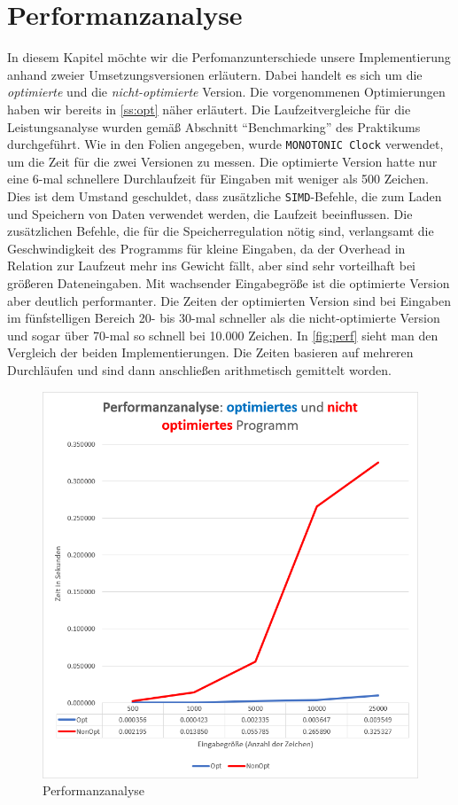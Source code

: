 \documentclass[course=erap]{aspdoc}
\begin{document}
\section{Performanzanalyse}
\label{perf}
In diesem Kapitel möchte wir die Perfomanzunterschiede unsere Implementierung anhand zweier Umsetzungsversionen erläutern. Dabei handelt es sich um die \textit{optimierte} und die \textit{nicht-optimierte} Version. Die vorgenommenen Optimierungen haben wir bereits in \autoref{ss:opt} näher erläutert. Die Laufzeitvergleiche für die Leistungsanalyse wurden gemäß Abschnitt "`Benchmarking"' des Praktikums durchgeführt. Wie in den Folien angegeben, wurde \texttt{MONOTONIC Clock} verwendet, um die Zeit für die zwei Versionen zu messen. Die optimierte Version hatte nur eine 6-mal schnellere Durchlaufzeit für Eingaben mit weniger als 500 Zeichen. Dies ist dem Umstand geschuldet, dass zusätzliche \texttt{SIMD}-Befehle, die zum Laden und Speichern von Daten verwendet werden, die Laufzeit beeinflussen. Die zusätzlichen Befehle, die für die Speicherregulation nötig sind, verlangsamt die Geschwindigkeit des Programms für kleine Eingaben, da der Overhead in Relation zur Laufzeut mehr ins Gewicht fällt, aber sind sehr vorteilhaft bei größeren Dateneingaben.
Mit wachsender Eingabegröße ist die optimierte Version aber deutlich performanter. Die Zeiten der optimierten Version sind bei Eingaben im fünfstelligen Bereich 20- bis 30-mal schneller als die nicht-optimierte Version und sogar über 70-mal so schnell bei 10.000 Zeichen. In \autoref{fig:perf} sieht man den Vergleich der beiden Implementierungen. Die Zeiten basieren auf mehreren Durchläufen und sind dann anschließen arithmetisch gemittelt worden. 

\begin{figure} [H]
    \centering
    \includegraphics[width = \textwidth]{Figures/Performance.png}
    \caption{Performanzanalyse}
    \label{fig:perf}
\end{figure}
\end{document}
